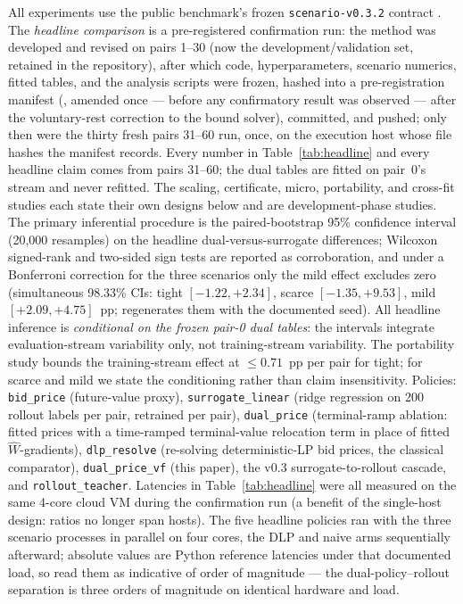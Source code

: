 \documentclass[11pt]{article}
\begin{document}
All experiments use the public benchmark's frozen
\texttt{scenario-v0.3.2} contract
\citep{chandrasekaran2026freightbidbench}. The \emph{headline
comparison} is a pre-registered confirmation run: the method was
developed and revised on pairs 1--30 (now the development/validation
set, retained in the repository), after which code, hyperparameters,
scenario numerics, fitted tables, and the analysis scripts were
frozen, hashed into a pre-registration manifest
(, amended once ---
before any confirmatory result was observed --- after the
voluntary-rest correction to the bound solver), committed, and
pushed; only then were the thirty fresh pairs 31--60 run, once, on
the execution host whose file hashes the manifest records. Every
number in Table~\ref{tab:headline} and every headline claim comes
from pairs 31--60; the dual tables are fitted on pair~0's stream and
never refitted. The scaling,
certificate, micro, portability, and cross-fit studies each state
their own designs below and are development-phase studies. The primary inferential procedure is the
paired-bootstrap 95\% confidence interval (20{,}000 resamples) on the
headline dual-versus-surrogate differences; Wilcoxon signed-rank and
two-sided sign tests are reported as corroboration, and under a
Bonferroni correction for the three scenarios only the mild
effect excludes zero (simultaneous 98.33\% CIs: tight
$[-1.22, +2.34]$, scarce $[-1.35, +9.53]$, mild $[+2.09, +4.75]$~pp;
 regenerates them with the
documented seed). All headline inference is \emph{conditional on the
frozen pair-0 dual tables}: the intervals integrate
evaluation-stream variability only, not training-stream variability.
The portability study bounds the training-stream effect at
$\leq 0.71$~pp per pair for tight; for scarce and mild we state the
conditioning rather than claim insensitivity. Policies: \texttt{bid\_price}
(future-value proxy), \texttt{surrogate\_linear} (ridge regression on
200 rollout labels per pair, retrained per pair), \texttt{dual\_price}
(terminal-ramp ablation: fitted prices with a time-ramped
terminal-value relocation term in place of fitted
$\widehat{W}$-gradients), \texttt{dlp\_resolve} (re-solving
deterministic-LP bid prices, the classical comparator),
\texttt{dual\_price\_vf} (this paper), the v0.3
surrogate-to-rollout cascade, and
\texttt{rollout\_teacher}. Latencies in Table~\ref{tab:headline}
were all measured on the same 4-core cloud VM during the
confirmation run (a benefit of the single-host design: ratios no
longer span hosts). The five headline policies ran with the three
scenario processes in parallel on four cores, the DLP and naive arms
sequentially afterward; absolute values are Python reference
latencies under that documented load, so read them as indicative of
order of magnitude --- the dual-policy--rollout separation is three
orders of magnitude on identical hardware and load.
\end{document}
